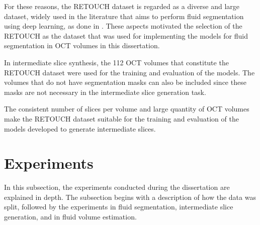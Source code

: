 \par
For these reasons, the RETOUCH dataset is regarded as a diverse and large dataset, widely used in the literature that aims to perform fluid segmentation using deep learning, as done in \parencite{Rahil2023, Zhang2023, Xing2022, Tang2022, Liu2024, Li2023, Hassan2021b, Lu2019}. These aspects motivated the selection of the RETOUCH as the dataset that was used for implementing the models for fluid segmentation in OCT volumes in this dissertation.
\par
In intermediate slice synthesis, the 112 OCT volumes that constitute the RETOUCH dataset were used for the training and evaluation of the models. The volumes that do not have segmentation masks can also be included since these masks are not necessary in the intermediate slice generation task.
\par
The consistent number of slices per volume and large quantity of OCT volumes make the RETOUCH dataset suitable for the training and evaluation of the models developed to generate intermediate slices.

\section{Experiments}\label{Experiments}
In this subsection, the experiments conducted during the dissertation are explained in depth. The subsection begins with a description of how the data was split, followed by the experiments in fluid segmentation, intermediate slice generation, and in fluid volume estimation.

